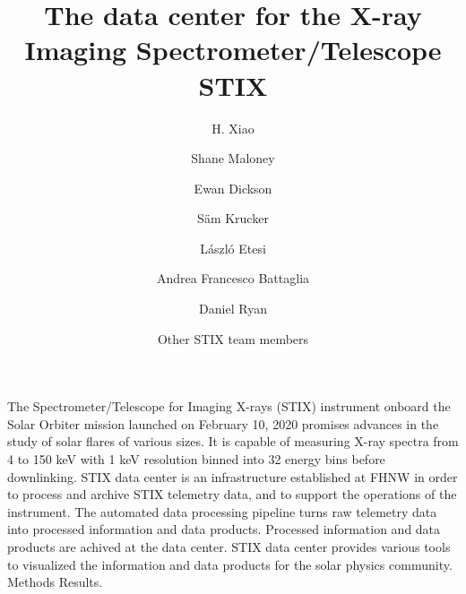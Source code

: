 \documentclass{aa}
\begin{document}
 


   \title{The data center for the X-ray Imaging Spectrometer/Telescope STIX}

   \subtitle{}

   \author{H. Xiao
          \and 
          Shane Maloney 
          \and 
          Ewan Dickson 
          \and 
          S\"am Krucker
            \and László Etesi 
          \and Andrea Francesco Battaglia
          \and Daniel Ryan
          \and Other STIX team members
         }


   \date{}

 
  \abstract
   {} %
   { The Spectrometer/Telescope for Imaging X-rays (STIX) instrument onboard the Solar Orbiter mission launched on February 10, 2020 promises advances in the study of solar flares of various sizes. It is capable of measuring X-ray spectra from 4 to 150 keV with 1 keV resolution binned into 32 energy bins before downlinking. STIX data center is an infrastructure established at FHNW in order to process and archive STIX telemetry data, and to support the operations of the instrument. The automated data processing pipeline turns raw telemetry data into processed information and data products. Processed information and data products are achived at the data center.  STIX data center provides various tools to visualized the information and data products for the solar physics community.
   }
   {Methods}
   {Results.}
   {}

\end{document}
